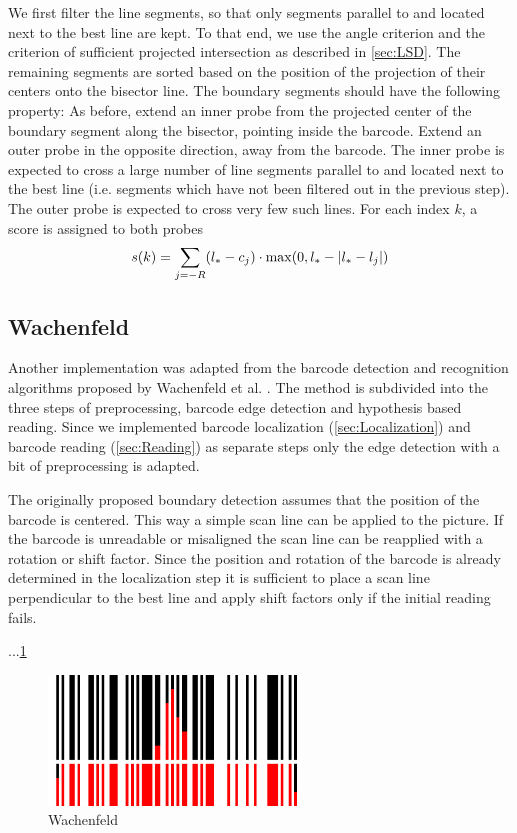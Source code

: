 We first filter the line segments, so that only segments parallel to and located
next to the best
line are kept. To that end, we use the angle criterion and the criterion of sufficient
projected intersection as described in \cref{sec:LSD}. The remaining segments
are sorted based on the position of the projection of their centers onto the
bisector line. The boundary segments should have the following property: As before,
extend an inner probe from the projected center of the boundary segment along the bisector, pointing inside the
barcode. Extend an outer probe in the opposite direction, away from the barcode.
The inner probe is expected to cross a large number of line segments parallel to
and located next to the best line (i.e. segments which have not been
filtered out in the previous step). The outer probe is expected to cross very few
such lines.
For each index $k$, a score is assigned to both probes
\begin{equation*}
 s(k)=\sum_{j=-R}(l_*-c_j)\cdot \max(0, l_*-\lvert l_*-l_j\rvert)
\end{equation*}

\subsection[Wachenfeld]{Wachenfeld}
Another implementation was adapted from the barcode detection and recognition algorithms proposed by Wachenfeld et al. \cite{wachenfeld2008robust}. The method is subdivided into the three steps of preprocessing, barcode edge detection and hypothesis based reading. Since we implemented barcode localization (\cref{sec:Localization}) and barcode reading (\cref{sec:Reading}) as separate steps only the edge detection with a bit of preprocessing is adapted.

The originally proposed boundary detection assumes that the position of the barcode is centered. This way a simple scan line can be applied to the picture. If the barcode is unreadable or misaligned the scan line can be reapplied with a rotation or shift factor. Since the position and rotation of the barcode is already determined in the localization step it is sufficient to place a scan line perpendicular to the best line and apply shift factors only if the initial reading fails. 

...\cref{wachenfeld}
 
\begin{figure}[t]
\center
\includegraphics[width=0.6\textwidth,natwidth=900,natheight=463]{img/wachenfeld.png}
\caption{Wachenfeld}
\label{wachenfeld}
\end{figure}


